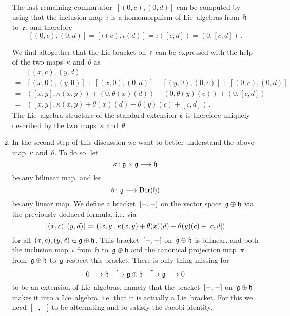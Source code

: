 \begin{fluff}
\begin{enumerate}
			The last remaining commutator~$[(0,c), (0,d)]$ can be computed by using that the inclusion map~$\iota$ is a homomorphism of Lie~algebras from~$\mathfrak{h}$ to~$\mathfrak{e}$, and therefore
			\[
				[(0,c), (0,d)]
				=
				[\iota(c), \iota(d)]
				=
				\iota([c,d])
				=
				(0, [c,d]) \,.
			\]

			We find altogether that the Lie bracket on~$\mathfrak{e}$ can be expressed with the help of the two maps~$\kappa$ and~$\theta$ as
			\begin{align*}
				{}&
				[ (x,c), (y,d) ]
				\\
				={}&
				[(x,0), (y,0)]
				+ [(x,0), (0,d)]
				- [(y,0), (0,c)]
				+ [(0,c), (0,d)]
				\\
				={}&
					( [x,y], \kappa(x,y) )
				+ ( 0, \theta(x)(d) )
				- ( 0, \theta(y)(c) )
				+ ( 0, [c,d] )
				\\
				={}&
				(
					[x,y],
					\kappa(x,y) + \theta(x)(d) - \theta(y)(c) + [c,d]
				) \,.
			\end{align*}
			The Lie~algebra structure of the standard extension~$\mathfrak{e}$ is therefore uniquely described by the two maps~$\kappa$ and~$\theta$.
		\item
			In the second step of this discussion we want to better understand the above map~$\kappa$ and~$\theta$.
			To do so, let
			\[
				\kappa
				\colon
				\glie \times \glie
				\to
				\hlie
			\]
			be any bilinear map, and let
			\[
				\theta
				\colon
				\glie
				\to
				\Der(\hlie)
			\]
			be any linear map.
			We define a bracket~$[-, -]$ on the vector space~$\mathfrak{g} \oplus \mathfrak{h}$ via the previously deduced formula, i.e. via
			\begin{equation}
				\label{definition of lie bracket depending on kappa and theta}
				[(x,c), (y,d)]
				\coloneqq
				(
					[x,y] ,
					\kappa(x,y) + \theta(x)(d) - \theta(y)(c) + [c,d]
				)
			\end{equation}
			for all~$(x,c), (y,d) \in \mathfrak{g} \oplus \mathfrak{h}$.
			This bracket~$[-, -]$ on~$\mathfrak{g} \oplus \mathfrak{h}$ is bilinear, and both the inclusion map~$\iota$ from~$\mathfrak{h}$ to~$\mathfrak{g} \oplus \mathfrak{h}$ and the canonical projection map~$\pi$ from~$\mathfrak{g} \oplus \mathfrak{h}$ to~$\mathfrak{g}$ respect this bracket.
			There is only thing missing for
			\[
				0
				\to
				\hlie
				\xto{\iota}
				\glie \oplus \hlie
				\xto{\pi}
				\glie
				\to
				0
			\]
			to be an extension of Lie~algebras, namely that the bracket~$[-, -]$ on~$\mathfrak{g} \oplus \mathfrak{h}$ makes it into a Lie~algebra, i.e. that it is actually a Lie~bracket.
			For this we need~$[-, -]$ to be alternating and to satisfy the Jacobi identity.


\end{enumerate}
\end{fluff}
